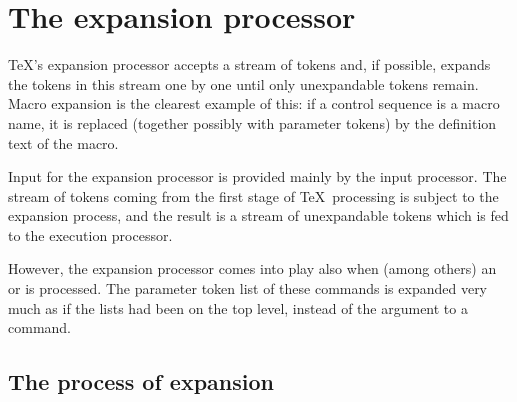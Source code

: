 \documentclass{book}
\begin{document}
\section{The expansion processor}

\TeX's  expansion processor accepts a stream of tokens
and, if possible, 
expands the tokens in this stream one by one
until only unexpandable tokens remain.
Macro expansion is the clearest example of this:
if a control sequence is a macro name, it is replaced
(together possibly with parameter tokens) by 
the definition text of the macro.

Input for the expansion processor is provided mainly
by the input processor. The stream of tokens coming
from the first stage of \TeX\ processing is subject
to the expansion process, and the result is a stream
of unexpandable tokens which is fed to the execution processor.

However, the expansion processor comes into play 
also when (among others) an  or  is processed.
The parameter token list of these commands is
expanded very much as if the lists had been
on the top level, instead of the argument to a command.

\subsection{The process of expansion}
\end{document}
